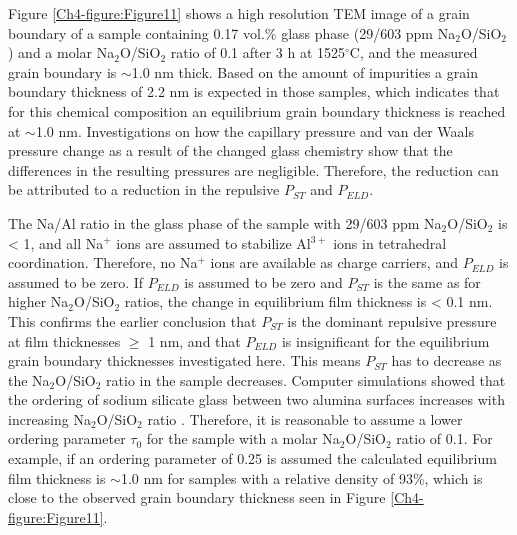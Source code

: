Figure \ref{Ch4-figure:Figure11} shows a high resolution TEM image of a grain boundary of a sample containing 0.17 vol.\% glass phase (29/603 ppm Na$_{2}$O/SiO$_{2}$) and a molar Na$_{2}$O/SiO$_{2}$ ratio of 0.1 after 3 h at 1525$^{\circ}$C, and the measured grain boundary is $\sim$1.0 nm thick. Based on the amount of impurities a grain boundary thickness of 2.2 nm is expected in those samples, which indicates that for this chemical composition an equilibrium grain boundary thickness \cite{Subramaniam2006} is reached at $\sim$1.0 nm. Investigations on how the capillary pressure and van der Waals pressure change as a result of the changed glass chemistry show that the differences in the resulting pressures are negligible. Therefore, the reduction can be attributed to a reduction in the repulsive $P_{ST}$ and $P_{ELD}$. 

The Na/Al ratio in the glass phase of the sample with 29/603 ppm Na$_{2}$O/SiO$_{2}$ is < 1, and all Na$^{+}$ ions are assumed to stabilize Al$^{3+}$ ions in tetrahedral coordination. Therefore, no Na$^{+}$ ions are available as charge carriers, and $P_{ELD}$ is assumed to be zero. If $P_{ELD}$ is assumed to be zero and $P_{ST}$ is the same as for higher Na$_{2}$O/SiO$_{2}$ ratios, the change in equilibrium film thickness is < 0.1 nm. This confirms the earlier conclusion that $P_{ST}$ is the dominant repulsive pressure at film thicknesses $\geq$ 1 nm, and that $P_{ELD}$ is insignificant for the equilibrium grain boundary thicknesses investigated here. This means $P_{ST}$ has to decrease as the Na$_{2}$O/SiO$_{2}$ ratio in the sample decreases. Computer simulations showed that the ordering of sodium silicate glass between two alumina surfaces increases with increasing Na$_{2}$O/SiO$_{2}$ ratio \cite{Litton1999}. Therefore, it is reasonable to assume a lower ordering parameter $\tau_{0}$ for the sample with a molar Na$_{2}$O/SiO$_{2}$ ratio of 0.1. For example, if an ordering parameter of 0.25 is assumed the calculated equilibrium film thickness is $\sim$1.0 nm for samples with a relative density of 93\%, which is close to the observed grain boundary thickness seen in Figure \ref{Ch4-figure:Figure11}.

